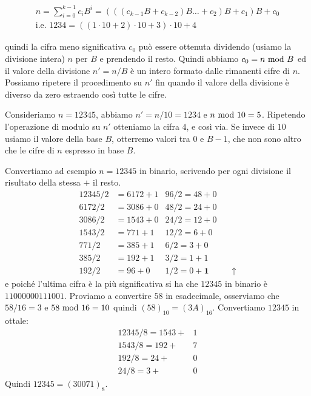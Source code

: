 \begin{align*} 
n = \sum_{i=0}^{k-1} c_iB^i = (((c_{k-1}B+c_{k-2})B\ldots+ c_2)B + c_1)B + c_0\\ 
\text{i.e. } 1234 = ((1\cdot{10}+2)\cdot{10}+3)\cdot{10} + 4 
\end{align*}

\noindent quindi la cifra meno significativa $c_0$ può essere ottenuta
dividendo (usiamo la divisione intera) $n$ per $B$ e prendendo il resto.
 Quindi abbiamo $c_0 = n \ \text{mod}\ B$ ed il valore della divisione $n' = n /
B$ è un intero formato dalle rimanenti cifre di $n$. Possiamo ripetere il
procedimento su $n'$ fin quando il valore della divisione è diverso da zero estraendo così tutte le cifre.

\begin{ex}
Consideriamo $n = 12345$, abbiamo $n' = n/10 = 1234$ e $n \ \text{mod}\ 10 = 5$. Ripetendo l'operazione di modulo su $n'$ otteniamo la cifra $4$, e così via. Se
invece di $10$ usiamo il valore della base $B$, otterremo valori tra $0$ e $B-1$, che non sono altro che le cifre di $n$ espresso in base $B$.

Convertiamo ad esempio $n = 12345$ in binario, scrivendo per ogni divisione il risultato della stessa $+$ il resto.
\begin{align*}
 12345 / 2 &= 6172 + 1   &96 / 2 = 48 + 0\\ 
 6172  / 2 &= 3086 + 0   &48 / 2 = 24 + 0\\
 3086  / 2 &= 1543 + 0   &24 / 2 = 12 + 0\\
 1543  / 2 &= 771 + 1    &12 / 2 = 6 + 0\\
 771   / 2 &= 385 + 1    &6 / 2  = 3 + 0\\
 385   / 2 &= 192 + 1    &3 / 2  = 1 + 1\\
 192   / 2 &= 96 + 0     &1 / 2  = 0 + \mathbf{1}& \quad \uparrow
\end{align*}
e poiché l'ultima cifra è la più significativa si ha che $12345$ in binario è $11000000111001$. Proviamo a convertire $58$ in esadecimale, osserviamo che $58/16 = 3$ e $58 \ \text{mod}\ 16 = 10$ quindi $(58)_{10} = (3A)_{16}$. Convertiamo $12345$ in ottale: 
\begin{align*}
 12345 / 8 = 1543 + &1 \\ 
 1543  / 8 = 192 + &7   \\
 192  / 8  = 24 + &0 \\
 24  / 8   = 3 + &0   
\end{align*}
\noindent Quindi $12345 = (30071)_8$. 
\end{ex}


